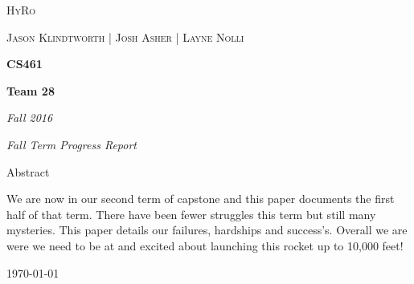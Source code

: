 \documentclass[10pt,draftclsnofoot,onecolumn]{IEEEtran}
\begin{document}
\begin{titlepage}
	\centering
	{\scshape\LARGE HyRo \par}
	\vspace{1cm}
	{\scshape\Large Jason Klindtworth  |  Josh Asher  |   Layne Nolli\par}
	\vspace{1.5cm}
	{\huge\bfseries CS461\par}
	\vspace{2cm}
	{\huge\bfseries Team 28\par}
	\vspace{2cm}
	{\Large\itshape Fall 2016\par}
	\vspace{4cm}
	{\Large\itshape Fall Term Progress Report\par}
	\vspace{4cm}
	{\large Abstract\par}
	\vspace{1cm}
	We are now in our second term of capstone and this paper documents the first half of that term. There have been fewer struggles this term but still many mysteries. This paper details our failures, hardships and success's. Overall we are were we need to be at and excited about launching this rocket up to 10,000 feet!\par

	\vfill

	{\large \today\par}
\end{titlepage}
\end{document}
